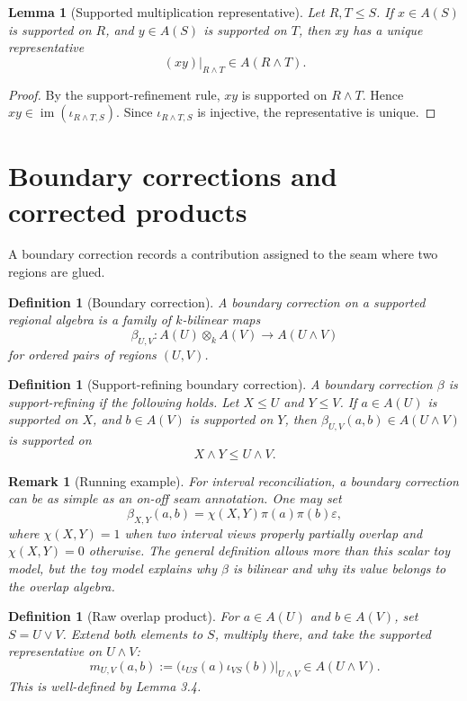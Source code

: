 \documentclass[11pt]{article}
\newtheorem{lemma}[theorem]{Lemma}
\newtheorem{definition}[theorem]{Definition}
\newtheorem{remark}[theorem]{Remark}
\newcommand{\im}{\operatorname{im}}
\begin{document}
\begin{lemma}[Supported multiplication representative]
Let \(R,T\leq S\). If \(x\in A(S)\) is supported on \(R\), and \(y\in A(S)\) is supported on \(T\), then \(xy\) has a unique representative
\[
(xy)\rvert_{R\wedge T}\in A(R\wedge T).
\]
\end{lemma}

\begin{proof}
By the support-refinement rule, \(xy\) is supported on \(R\wedge T\). Hence \(xy\in \im(\iota_{R\wedge T,S})\). Since \(\iota_{R\wedge T,S}\) is injective, the representative is unique.
\end{proof}

\section{Boundary corrections and corrected products}

A boundary correction records a contribution assigned to the seam where two regions are glued.

\begin{definition}[Boundary correction]
A boundary correction on a supported regional algebra is a family of \(k\)-bilinear maps
\[
\beta_{U,V}:A(U)\otimes_k A(V)\to A(U\wedge V)
\]
for ordered pairs of regions \((U,V)\).
\end{definition}

\begin{definition}[Support-refining boundary correction]
A boundary correction \(\beta\) is support-refining if the following holds. Let \(X\leq U\) and \(Y\leq V\). If \(a\in A(U)\) is supported on \(X\), and \(b\in A(V)\) is supported on \(Y\), then \(\beta_{U,V}(a,b)\in A(U\wedge V)\) is supported on
\[
X\wedge Y\leq U\wedge V.
\]
\end{definition}

\begin{remark}[Running example]
For interval reconciliation, a boundary correction can be as simple as an on-off seam annotation. One may set
\[
\beta_{X,Y}(a,b)=\chi(X,Y)\pi(a)\pi(b)\varepsilon,
\]
where \(\chi(X,Y)=1\) when two interval views properly partially overlap and \(\chi(X,Y)=0\) otherwise. The general definition allows more than this scalar toy model, but the toy model explains why \(\beta\) is bilinear and why its value belongs to the overlap algebra.
\end{remark}

\begin{definition}[Raw overlap product]
For \(a\in A(U)\) and \(b\in A(V)\), set \(S=U\vee V\). Extend both elements to \(S\), multiply there, and take the supported representative on \(U\wedge V\):
\[
m_{U,V}(a,b):=\bigl(\iota_{US}(a)\iota_{VS}(b)\bigr)\rvert_{U\wedge V}\in A(U\wedge V).
\]
This is well-defined by Lemma 3.4.
\end{definition}
\end{document}
